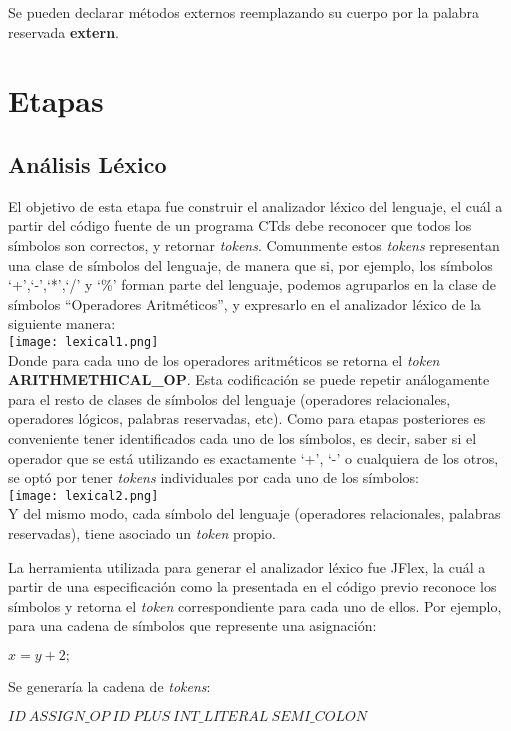 \documentclass[11pt,a4paper]{article}
\begin{document}
Se pueden declarar métodos externos reemplazando su cuerpo por la palabra reservada \textbf{extern}.
\section{Etapas} 
\label{sec:etapas}

\subsection{Análisis Léxico} 
\label{subsec:lexico}

El objetivo de esta etapa fue construir el analizador léxico del lenguaje, el cuál a partir del código fuente de un programa CTds debe reconocer que todos los símbolos son correctos, y retornar \textit{tokens}. Comunmente estos \textit{tokens} representan una clase de símbolos del lenguaje, de manera que si, por ejemplo, los símbolos `+',`-',`*',`/' y `\%' forman parte del lenguaje, podemos agruparlos en la clase de símbolos ``Operadores Aritméticos'', y expresarlo en el analizador léxico de la siguiente manera:
\\

\texttt{[image: lexical1.png]} \\ 
 
Donde para cada uno de los operadores aritméticos se retorna el \textit{token} \textbf{ARITHMETHICAL_OP}. Esta codificación se puede repetir análogamente para el resto de clases de símbolos del lenguaje (operadores relacionales, operadores lógicos, palabras reservadas, etc). Como para etapas posteriores es conveniente tener identificados cada uno de los símbolos, es decir, saber si el operador que se está utilizando es exactamente `+', `-' o cualquiera de los otros, se optó por tener \textit{tokens} individuales por cada uno de los símbolos:
\\

\texttt{[image: lexical2.png]} \\ 

Y del mismo modo, cada símbolo del lenguaje (operadores relacionales, palabras reservadas), tiene asociado un \textit{token} propio.

La herramienta utilizada para generar el analizador léxico fue JFlex, la cuál a partir de una especificación como la presentada en el código previo reconoce los símbolos y retorna el \textit{token} correspondiente para cada uno de ellos. Por ejemplo, para una cadena de símbolos que represente una asignación:
\begin{center}
	$x = y+2 ;$
\end{center}
Se generaría la cadena de \textit{tokens}:
\begin{center}
	$ID \ ASSIGN\_OP \ ID \ PLUS \ INT\_LITERAL \ SEMI\_COLON$
\end{center}
\end{document}
